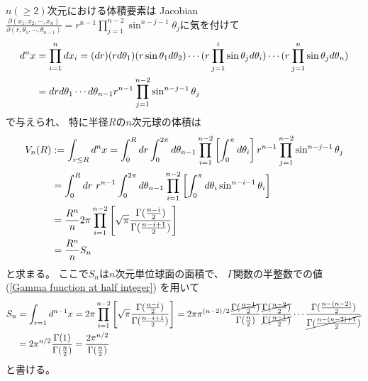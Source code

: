 $n (\ge 2)$次元における体積要素は
Jacobian
$\displaystyle
\frac{\partial(x_1, x_2, \cdots, x_n)}
    {\partial(r, \theta_1, \cdots, \theta_{n-1})}
=
    r^{n-1}
    \prod_{j = 1}^{n-2}
    \sin^{n - j - 1} \theta_j
$に気を付けて
\begin{align}
    d^n x
&=
    \prod_{i = 1}^n
    d x_i
=
    (dr)
    (r d \theta_1)
    (r \sin \theta_1 d \theta_2)
\cdots
    (r \prod_{j = 1}^i
    \sin \theta_j d \theta_i)
\cdots
    (r \prod_{j = 1}^n
    \sin \theta_j d \theta_n)
\notag\\&
=
    d r d \theta_1
        \cdots d \theta_{n-1}
    r^{n-1}
    \prod_{j = 1}^{n-2}
    \sin^{n - j - 1} \theta_j
\end{align}
で与えられ、
特に半径$R$の$n$次元球の体積は
\begin{align}
    V_n(R)
&:=
    \int_{r \le R} d^n x
=
    \int_0^R
        dr
    \int_0^{2 \pi}
        d \theta_{n-1}
    \prod_{i=1}^{n-2}
    \left[
        \int_0^{\pi}
            d \theta_i
    \right]
    r^{n-1}
    \prod_{j = 1}^{n-2}
    \sin^{n - j - 1} \theta_j
\notag\\&
=
    \int_0^R
        dr\ 
    r^{n-1}
    \int_0^{2 \pi}
        d \theta_{n-1}
    \prod_{i=1}^{n-2}
    \left[
        \int_0^{\pi}
            d \theta_i
        \sin^{n - i - 1} \theta_i
    \right]
\notag\\&
=
    \dfrac{R^n}{n}
    2 \pi
    \prod_{i=1}^{n-2}
    \left[
        \sqrt{\pi}
        \dfrac{\Gamma(\frac{n - i}{2})}
        {\Gamma(\frac{n - i + 1}{2})}
    \right]
\notag\\&
=
    \dfrac{R^n}{n}
    S_n
\end{align}
と求まる。
ここで$S_n$は$n$次元単位球面の面積で、
$\Gamma$関数の半整数での値
(\ref{Gamma function at half integer})
を用いて
\begin{align}
    S_n
&=
    \int_{r = 1}
        d^{n-1} x
=
    2 \pi
    \prod_{i=1}^{n-2}
    \left[
        \sqrt{\pi}
        \dfrac{\Gamma(\frac{n - i}{2})}
        {\Gamma(\frac{n - i + 1}{2})}
    \right]
=
    2 \pi
    \pi^{(n-2)/2}
    \dfrac{
        \cancel{
            \Gamma(\frac{n - 1}{2})
        }
    }
        {\Gamma(\frac{n}{2})}
    \dfrac{
        \cancel{
            \Gamma(\frac{n - 2}{2})
        }
    }
        {\cancel{
            \Gamma(\frac{n - 1}{2})
        }}
    \cdots
    \dfrac{\Gamma(\frac{n - (n-2)}{2})}
        {\cancel{
            \Gamma(\frac{n - (n-2) + 1}{2})
        }}
\notag\\&
=
    2
    \pi^{n/2}
    \dfrac{\Gamma(1)}
        {\Gamma(\frac{n}{2})}
=
    \dfrac{ 2 \pi^{n/2} }
        {\Gamma(\frac{n}{2})}
\label{surface area of n dimensional sphere}
\end{align}
と書ける。

